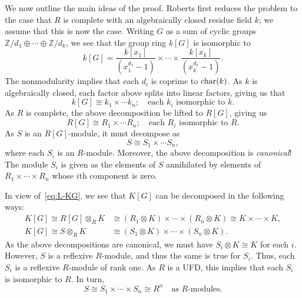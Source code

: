\documentclass[12pt]{article}
\begin{document}
	We now outline the main ideas of the proof. 
	Roberts first reduces the problem to the case that $R$ is complete with an algebraically closed residue field $k$; we assume that this is now the case. 
	Writing $G$ as a sum of cyclic groups $\mathbb{Z}/d_{1} \oplus \cdots \oplus \mathbb{Z}/d_{k}$, we see that the group ring $k[G]$ is isomorphic to
	\begin{equation*} 
		k[G] = 
		\frac{k[x_{1}]}{(x_{1}^{d_{1}} - 1)}
		\times \cdots \times
		\frac{k[x_{k}]}{(x_{k}^{d_{k}} - 1)}.
	\end{equation*}
	The nonmodularity implies that each $d_{i}$ is coprime to $\operatorname{char}(k)$. 
	As $k$ is algebraically closed, each factor above splits into linear factors, giving us that
	\begin{equation*} 
		k[G] \cong k_{1} \times \cdots k_{n}; 
		\quad \text{each $k_{i}$ isomorphic to $k$}.
	\end{equation*}
	As $R$ is complete, the above decomposition be lifted to $R[G]$, giving us
	\begin{equation*} 
		R[G] \cong R_{1} \times \cdots R_{n}; 
		\quad \text{each $R_{i}$ isomorphic to $R$}.
	\end{equation*}
	As $S$ is an $R[G]$-module, it must decompose as
	\begin{equation*} %
		S \cong S_{1} \times \cdots S_{n},
	\end{equation*}
	where each $S_{i}$ is an $R$-module. Moreover, the above decomposition is \emph{canonical}! 
	The module $S_{i}$ is given as the elements of $S$ annihilated by elements of 
	$R_{1} \times \cdots \times R_{n}$ whose $i$th component is zero. 

	In view of~\eqref{eq:L-KG}, we see that $K[G]$ can be decomposed in the following ways:
	\begin{align*} 
		K[G] \cong R[G] \otimes_{R} K &\cong 
		(R_{1} \otimes K) \times \cdots \times (R_{n} \otimes K)
		\cong K \times \cdots \times K, \\
		K[G] \cong S \otimes_{R} K &\cong 
		(S_{1} \otimes K) \times \cdots \times (S_{n} \otimes K).
	\end{align*} 
	As the above decompositions are canonical, we must have 
	$S_{i} \otimes K \cong K$ for each $i$. 
	However, $S$ is a reflexive $R$-module, and thus the same is true for $S_{i}$. 
	Thus, each $S_{i}$ is a reflexive $R$-module of rank one. 
	As $R$ is a UFD, this implies that each $S_{i}$ is isomorphic to $R$. 
	In turn,
	\begin{equation*} 
		S \cong S_{1} \times \cdots \times S_{n} \cong R^{n} 
		\quad
		\text{as $R$-modules.}
	\end{equation*}
\end{document}
